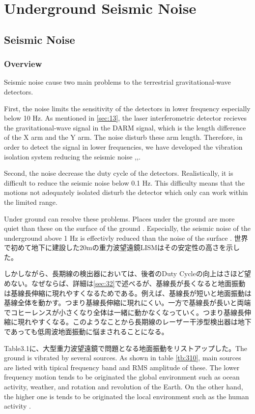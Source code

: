 \chapter{Underground Seismic Noise}

\section{Seismic Noise}
\subsection{Overview}
Seismic noise cause two main problems to the terrestrial gravitational-wave detectors.

First, the noise limits the sensitivity of the detectors in lower frequency especially below 10 $\mathrm{Hz}$. As mentioned in \cref{sec:13}, the laser interferometric detector recieves the gravitational-wave signal in the DARM signal, which is the length difference of the X arm and the Y arm. The noise disturb these arm length. Therefore, in order to detect the signal in lower frequencies, we have developed the vibration isolation system reducing the seismic noise \cite{takamori2002low},\cite{sekiguchi2016astudy},\cite{Okutomi2019development}.

Second, the noise decrease the duty cycle of the detectors. Realistically, it is difficult to reduce the seismic noise below 0.1 $\mathrm{Hz}$. This difficulty means that the motions not adequately isolated disturb the detector which only can work within the limited range. 

Under ground can resolve these problems. Places under the ground are more quiet than these on the surface of the ground \cite{carter1991high}. Especially, the seismic noise of the underground above 1 $\mathrm{Hz}$ is effectivly reduced than the noise of the surface \cite{lcgt2009lcgt}. 世界で初めて地下に建設した20mの重力波望遠鏡LISMはその安定性の高さを示した\cite{sato2004ultrastable}。

しかしながら、長期線の検出器においては、後者のDuty Cycleの向上はさほど望めない。なぜならば、詳細は\cref{sec:32}で述べるが、基線長が長くなると地面振動は基線長伸縮に現れやすくなるためである。例えば、基線長が短いと地面振動は基線全体を動かす。つまり基線長伸縮に現れにくい。一方で基線長が長いと両端でコヒーレンスが小さくなり全体は一緒に動かなくなっていく。つまり基線長伸縮に現れやすくなる。このようなことから長期線のレーザー干渉型検出器は地下であっても低周波地面振動に悩まされることになる。

Table3.1に、大型重力波望遠鏡で問題となる地面振動をリストアップした。The ground is vibrated by several sources. As shown in table \ref{tb:310}, main sources are listed with tipical frequency band and RMS amplitude of these. The lower frequency motion tends to be originated the global environment such as ocean activity, weather, and rotation and revolution of the Earth. On the other hand, the higher one is tends to be originated the local environment such as the human activity .

